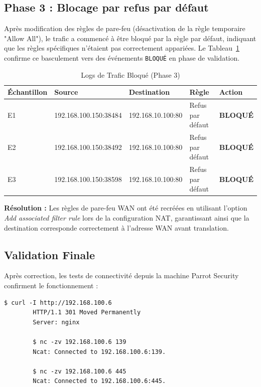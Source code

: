 \documentclass[12pt,a4paper,openany]{report}
\newcommand{\tableheadcolor}{\rowcolor{tableheadbg}}
\begin{document}
	\subsection{Phase 3 : Blocage par refus par défaut}
	Après modification des règles de pare-feu (désactivation de la règle temporaire "Allow All"), le trafic a commencé à être bloqué par la règle par défaut, indiquant que les règles spécifiques n'étaient pas correctement appariées.
	Le Tableau~\ref{tab:logs-deny} confirme ce basculement vers des événements \texttt{BLOQUÉ} en phase de validation.
	
	\begin{table}[ht]
		\centering
		\small
		\renewcommand{\arraystretch}{1.4}
		\setlength{\arrayrulewidth}{0.5pt}
		\begin{tabular}{p{2.2cm} p{4.2cm} p{3.4cm} p{3.4cm} >{\centering\arraybackslash}p{1.6cm}}
			\arrayrulecolor{tableborder}
			\hline
			\tableheadcolor
			\textcolor{tableheadfg}{\textbf{Échantillon}} &
			\textcolor{tableheadfg}{\textbf{Source}} &
			\textcolor{tableheadfg}{\textbf{Destination}} &
			\textcolor{tableheadfg}{\textbf{Règle}} &
			\textcolor{tableheadfg}{\textbf{Action}} \\
			\hline
			\rowcolor{tablerowalt}
			E1 & 192.168.100.150:38484 & 192.168.10.100:80 & Refus par défaut & \textcolor{accent}{\textbf{BLOQUÉ}} \\
			E2 & 192.168.100.150:38492 & 192.168.10.100:80 & Refus par défaut & \textcolor{accent}{\textbf{BLOQUÉ}} \\
			\rowcolor{tablerowalt}
			E3 & 192.168.100.150:38598 & 192.168.10.100:80 & Refus par défaut & \textcolor{accent}{\textbf{BLOQUÉ}} \\
			\hline
		\end{tabular}
		\caption{Logs de Trafic Bloqué (Phase 3)}
		\label{tab:logs-deny}
	\end{table}
	
	\textbf{Résolution :} Les règles de pare-feu WAN ont été recréées en utilisant l'option \textit{Add associated filter rule} lors de la configuration NAT, garantissant ainsi que la destination corresponde correctement à l'adresse WAN avant translation.
	
	\subsection{Validation Finale}
	Après correction, les tests de connectivité depuis la machine Parrot Security confirment le fonctionnement :
	\begin{lstlisting}[caption=Tests de Connectivité depuis l'Attaquant (Parrot)]
		$ curl -I http://192.168.100.6
		HTTP/1.1 301 Moved Permanently
		Server: nginx
		
		$ nc -zv 192.168.100.6 139
		Ncat: Connected to 192.168.100.6:139.
		
		$ nc -zv 192.168.100.6 445
		Ncat: Connected to 192.168.100.6:445.
	\end{lstlisting}
	
\end{document}
